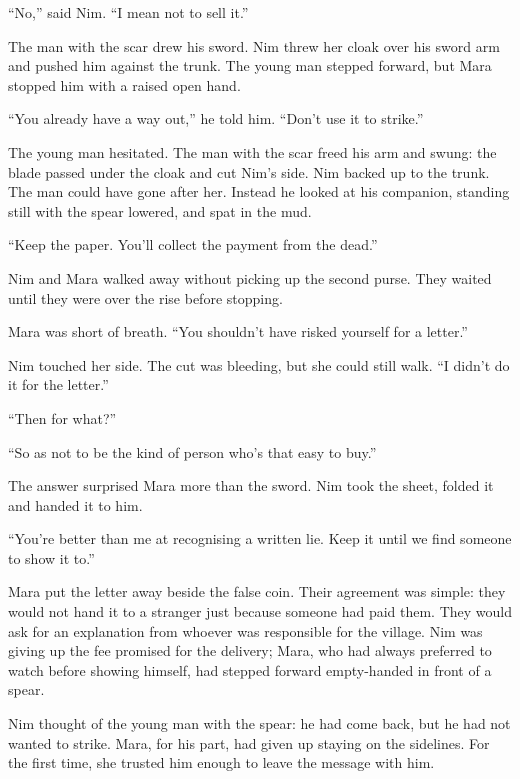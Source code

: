 \documentclass[10pt,a4paper]{article}
\begin{document}
“No,” said Nim. “I mean not to sell it.”

The man with the scar drew his sword. Nim threw her cloak over his sword arm and pushed him against the trunk. The young man stepped forward, but Mara stopped him with a raised open hand.

“You already have a way out,” he told him. “Don't use it to strike.”

The young man hesitated. The man with the scar freed his arm and swung: the blade passed under the cloak and cut Nim's side. Nim backed up to the trunk. The man could have gone after her. Instead he looked at his companion, standing still with the spear lowered, and spat in the mud.

“Keep the paper. You'll collect the payment from the dead.”

Nim and Mara walked away without picking up the second purse. They waited until they were over the rise before stopping.

Mara was short of breath. “You shouldn't have risked yourself for a letter.”

Nim touched her side. The cut was bleeding, but she could still walk. “I didn't do it for the letter.”

“Then for what?”

“So as not to be the kind of person who's that easy to buy.”

The answer surprised Mara more than the sword. Nim took the sheet, folded it and handed it to him.

“You're better than me at recognising a written lie. Keep it until we find someone to show it to.”

Mara put the letter away beside the false coin. Their agreement was simple: they would not hand it to a stranger just because someone had paid them. They would ask for an explanation from whoever was responsible for the village. Nim was giving up the fee promised for the delivery; Mara, who had always preferred to watch before showing himself, had stepped forward empty-handed in front of a spear.

Nim thought of the young man with the spear: he had come back, but he had not wanted to strike. Mara, for his part, had given up staying on the sidelines. For the first time, she trusted him enough to leave the message with him.
\end{document}
